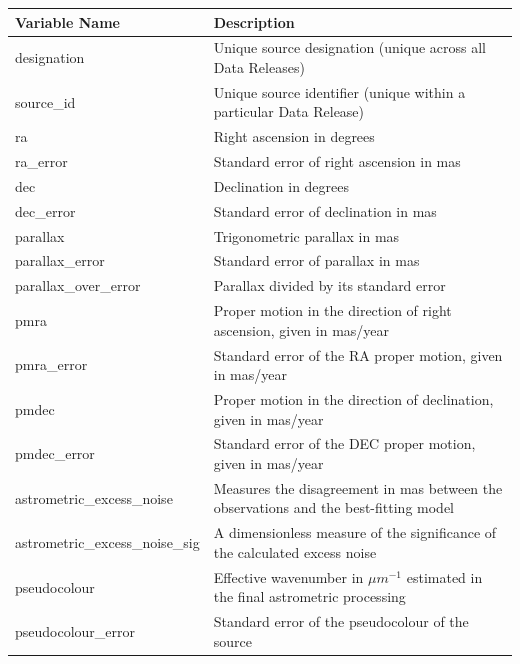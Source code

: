\documentclass[onecolumn,table,xcdraw,super]{aastex631}
\begin{document}
\begin{table}[] \label{tab:variables}
\centering
{}
\begin{tabular}{ll}
\toprule
Variable Name                & Description \\
\midrule
designation                  &  Unique source designation (unique across all Data Releases)           \\
source\_id                    & Unique source identifier (unique within a particular Data Release)            \\
ra                           &  Right ascension in degrees           \\
ra\_error                     & Standard error of right ascension in mas            \\
dec                          &  Declination in degrees           \\
dec\_error                    &  Standard error of declination in mas           \\
parallax                     &  Trigonometric parallax in mas           \\
parallax\_error               &  Standard error of parallax in mas           \\
parallax\_over\_error          & Parallax divided by its standard error            \\
pmra                         &  Proper motion in the direction of right ascension, given in mas/year        \\
pmra\_error                   &  Standard error of the RA proper motion, given in mas/year           \\
pmdec                        & Proper motion in the direction of declination, given in mas/year             \\
pmdec\_error                  & Standard error of the DEC proper motion, given in mas/year           \\
astrometric\_excess\_noise     & Measures the disagreement in mas between the observations and the best-fitting model            \\
astrometric\_excess\_noise\_sig & A dimensionless measure of the significance of the calculated excess noise           \\
pseudocolour                 & Effective wavenumber in $\mu m^{-1}$ estimated in the final astrometric processing             \\
pseudocolour\_error           & Standard error of the pseudocolour of the source            \\

\end{tabular}
\end{table}
\end{document}
